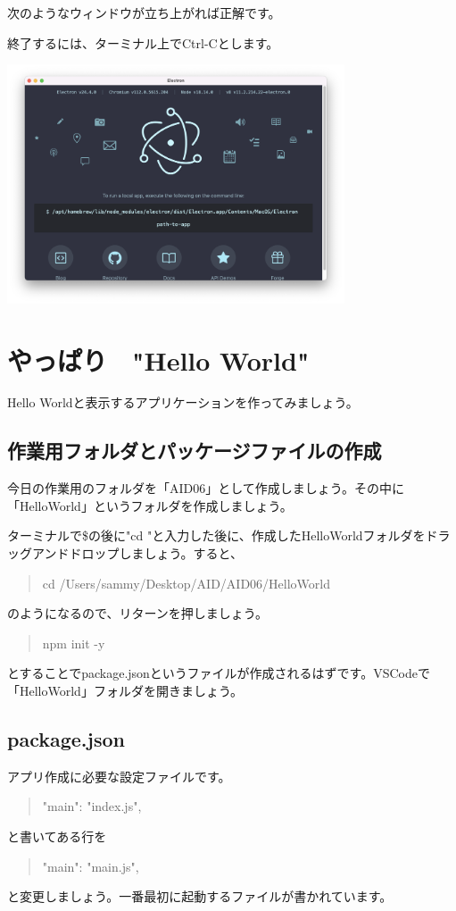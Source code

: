 \documentclass[mingoth,11pt,a4j,uplatex]{jsarticle}
\begin{document}
次のようなウィンドウが立ち上がれば正解です。

終了するには、ターミナル上でCtrl-Cとします。

\includegraphics[width=10cm]{img/electron_default.png}

\section{やっぱり　"Hello World"}
Hello Worldと表示するアプリケーションを作ってみましょう。

\subsection{作業用フォルダとパッケージファイルの作成}
今日の作業用のフォルダを「AID06」として作成しましょう。その中に「HelloWorld」というフォルダを作成しましょう。

ターミナルで\$の後に"cd "と入力した後に、作成したHelloWorldフォルダをドラッグアンドドロップしましょう。すると、
\begin{quote}
cd /Users/sammy/Desktop/AID/AID06/HelloWorld 
\end{quote}
のようになるので、リターンを押しましょう。

\begin{quote}
npm init -y
\end{quote}
とすることでpackage.jsonというファイルが作成されるはずです。VSCodeで「HelloWorld」フォルダを開きましょう。

\subsection{package.json}
アプリ作成に必要な設定ファイルです。
\begin{quote}
  "main": "index.js",
\end{quote}
と書いてある行を
\begin{quote}
  "main": "main.js",
\end{quote}
と変更しましょう。一番最初に起動するファイルが書かれています。
\end{document}
